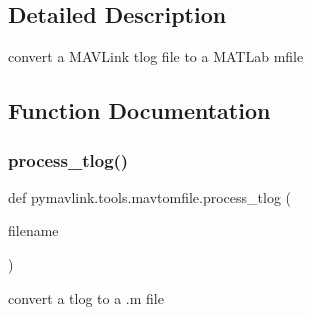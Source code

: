 \subsection{Detailed Description}
\begin{DoxyVerb}convert a MAVLink tlog file to a MATLab mfile
\end{DoxyVerb}
 

\subsection{Function Documentation}
\mbox{\label{namespacepymavlink_1_1tools_1_1mavtomfile_aa9bda5eaab8f660bdd5f3a366ade93e3}} 
\subsubsection{\texorpdfstring{process\+\_\+tlog()}{process\_tlog()}}
{\footnotesize\ttfamily def pymavlink.\+tools.\+mavtomfile.\+process\+\_\+tlog (\begin{DoxyParamCaption}\item[{}]{filename }\end{DoxyParamCaption})}

\begin{DoxyVerb}convert a tlog to a .m file\end{DoxyVerb}
 